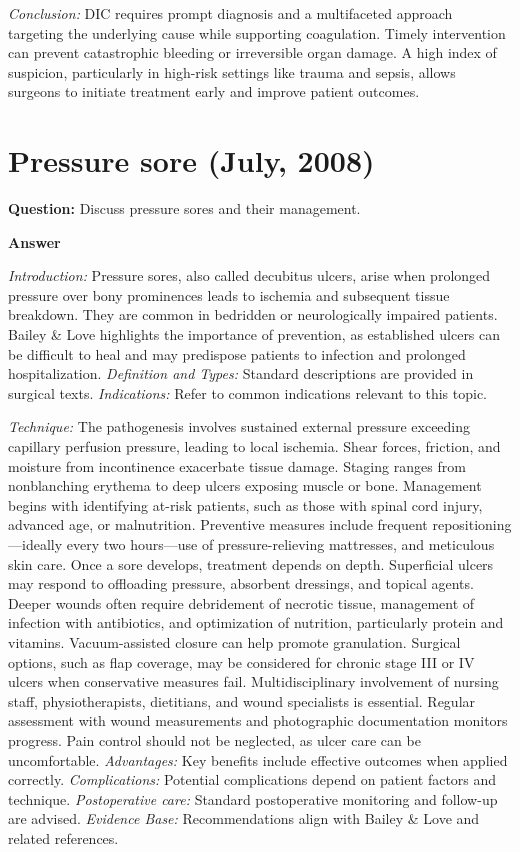 \documentclass{article}
\begin{document}
\emph{Conclusion:} DIC requires prompt diagnosis and a multifaceted approach targeting the underlying cause while supporting coagulation. Timely intervention can prevent catastrophic bleeding or irreversible organ damage. A high index of suspicion, particularly in high-risk settings like trauma and sepsis, allows surgeons to initiate treatment early and improve patient outcomes.


\section{Pressure sore (July, 2008)}

\textbf{Question:} Discuss pressure sores and their management.

\textbf{Answer}

\emph{Introduction:} Pressure sores, also called decubitus ulcers, arise when prolonged pressure over bony prominences leads to ischemia and subsequent tissue breakdown. They are common in bedridden or neurologically impaired patients. Bailey \& Love highlights the importance of prevention, as established ulcers can be difficult to heal and may predispose patients to infection and prolonged hospitalization.
\emph{Definition and Types:} Standard descriptions are provided in surgical texts.
\emph{Indications:} Refer to common indications relevant to this topic.

\emph{Technique:} The pathogenesis involves sustained external pressure exceeding capillary perfusion pressure, leading to local ischemia. Shear forces, friction, and moisture from incontinence exacerbate tissue damage. Staging ranges from nonblanching erythema to deep ulcers exposing muscle or bone. Management begins with identifying at-risk patients, such as those with spinal cord injury, advanced age, or malnutrition. Preventive measures include frequent repositioning—ideally every two hours—use of pressure-relieving mattresses, and meticulous skin care. Once a sore develops, treatment depends on depth. Superficial ulcers may respond to offloading pressure, absorbent dressings, and topical agents. Deeper wounds often require debridement of necrotic tissue, management of infection with antibiotics, and optimization of nutrition, particularly protein and vitamins. Vacuum-assisted closure can help promote granulation. Surgical options, such as flap coverage, may be considered for chronic stage III or IV ulcers when conservative measures fail. Multidisciplinary involvement of nursing staff, physiotherapists, dietitians, and wound specialists is essential. Regular assessment with wound measurements and photographic documentation monitors progress. Pain control should not be neglected, as ulcer care can be uncomfortable.
\emph{Advantages:} Key benefits include effective outcomes when applied correctly.
\emph{Complications:} Potential complications depend on patient factors and technique.
\emph{Postoperative care:} Standard postoperative monitoring and follow-up are advised.
\emph{Evidence Base:} Recommendations align with Bailey \& Love and related references.
\end{document}
